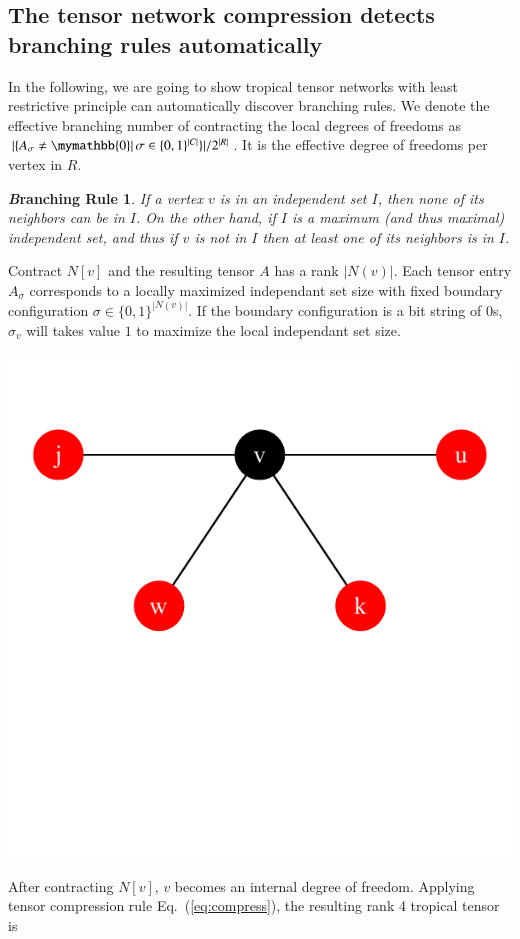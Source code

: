 \documentclass{article}
\newcommand{\<}{\langle}
\renewcommand{\>}{\rangle}
\newcommand{\Eq}[1]{Eq.~(\ref{#1})}
\newtheorem{corollary}{\textit Branching Rule}
\theoremstyle{definition}\newtheorem{definition}{\textit{Definition}}
\begin{document}
\subsection{The tensor network compression detects branching rules automatically}
In the following, we are going to show tropical tensor networks with least restrictive principle can automatically discover branching rules.
We denote the effective branching number of contracting the local degrees of freedoms as $\left|\{A_{\sigma} \neq \mymathbb{0}\right|\sigma \in \{0, 1\}^{|C|}\}|/2^{|R|}$.
It is the effective degree of freedoms per vertex in $R$.

\begin{corollary}\label{rule:one} %
  If a vertex $v$ is in an independent set $I$, then none of its neighbors can be in $I$.
On the other hand, if $I$ is a maximum (and thus maximal) independent set,
and thus if $v$ is not in $I$ then at least one of its neighbors is in $I$.
\end{corollary}

Contract $N[v]$ and the resulting tensor $A$ has a rank $|N(v)|$. Each tensor entry $A_{\sigma}$ corresponds to a locally maximized independant set size with fixed boundary configuration $\sigma \in \{0, 1\}^{|N(v)|}$.
If the boundary configuration is a bit string of 0s, $\sigma_v$ will takes value $1$ to maximize the local independant set size.

\centerline{\includegraphics[width=0.4\columnwidth,trim={0 3.5cm 0 1cm},clip]{../notebooks/basic.pdf}}

After contracting $N[v]$, $v$ becomes an internal degree of freedom.
Applying tensor compression rule \Eq{eq:compress}, the resulting rank 4 tropical tensor is
\end{document}
